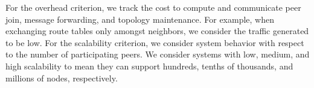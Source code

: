 


For the overhead criterion, we track the cost to compute and communicate peer
join, message forwarding, and topology maintenance. For example, when exchanging
route tables only amongst neighbors, we consider the traffic generated to
be low.
For the scalability criterion, we consider system behavior with respect to the number of
participating peers. We consider systems with low, medium, and high scalability 
to mean they can support 
hundreds, tenths of thousands, and millions of nodes,
respectively. 






%
%
%

